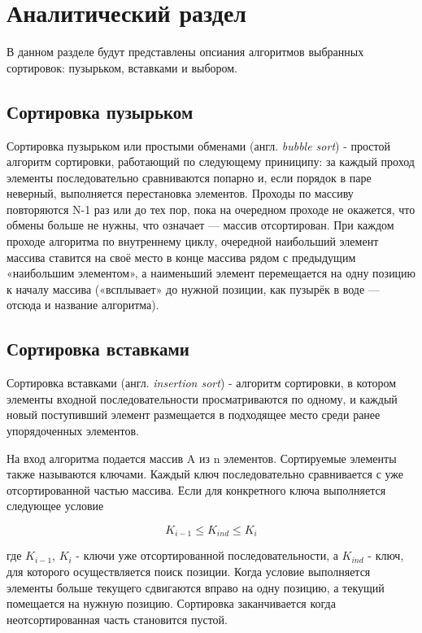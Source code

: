 \chapter{Аналитический раздел}

В данном разделе будут представлены опсиания алгоритмов выбранных сортировок: пузырьком, вставками и выбором.

\section{Сортировка пузырьком}

Сортировка пузырьком или простыми обменами \cite{bubbleSort} (англ. \textit{bubble sort}) - простой алгоритм сортировки, работающий по следующему приниципу: за каждый проход элементы последовательно сравниваются попарно и, если порядок в паре неверный, выполняется перестановка элементов. Проходы по массиву повторяются N-1 раз или до тех пор, пока на очередном проходе не окажется, что обмены больше не нужны, что означает — массив отсортирован. При каждом проходе алгоритма по внутреннему циклу, очередной наибольший элемент массива ставится на своё место в конце массива рядом с предыдущим «наибольшим элементом», а наименьший элемент перемещается на одну позицию к началу массива («всплывает» до нужной позиции, как пузырёк в воде — отсюда и название алгоритма).

\section{Сортировка вставками}

Сортировка вставками \cite{insertionSort} (англ. \textit{insertion sort}) - алгоритм сортировки, в котором элементы входной последовательности просматриваются по одному, и каждый новый поступивший элемент размещается в подходящее место среди ранее упорядоченных элементов.

На вход алгоритма подается массив A из n элементов. Сортируемые элементы также называются ключами. Каждый ключ последовательно сравнивается с уже отсортированной частью массива. Если для конкретного ключа выполняется следующее условие

\begin{equation}
	K_{i - 1} \leq K_{ind} \leq K_{i}
\end{equation}

где $K_{i - 1}$, $K_{i}$ - ключи уже отсортированной последовательности, а $K_{ind}$ - ключ, для которого осуществляется поиск позиции. Когда условие выполняется элементы больше текущего сдвигаются вправо на одну позицию, а текущий помещается на нужную позицию. Сортировка заканчивается когда неотсортированная часть становится пустой.


